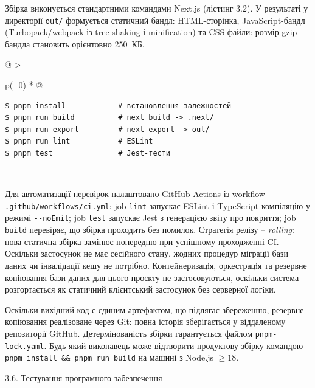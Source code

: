 \documentclass[
]{article}
\begin{document}
Збірка виконується стандартними командами Next.js (лістинг 3.2). У
результаті у директорії \texttt{out}\texttt{/} формується статичний
бандл: HTML-сторінка, JavaScript-бандл (Turbopack/webpack із
tree-shaking і minification) та CSS-файли: розмір gzip-бандла становить
орієнтовно 250~КБ.

\begin{longtable}[]{@{}
  >{\raggedright\arraybackslash}p{}@{}}
\caption{Лістинг 3.2. Команди збірки та перевірки проєкту. Джерело:
розроблено автором.}\tabularnewline
\toprule\noalign{}
\endfirsthead
\endhead
\bottomrule\noalign{}
\endlastfoot
\begin{minipage}[t]{\linewidth}\raggedright
\begin{verbatim}
$ pnpm install            # встановлення залежностей
$ pnpm run build          # next build -> .next/
$ pnpm run export         # next export -> out/
$ pnpm run lint           # ESLint
$ pnpm test               # Jest-тести
\end{verbatim}
\end{minipage} \\
\end{longtable}

Для автоматизації перевірок налаштовано GitHub Actions із workflow
\texttt{.}\texttt{github}\texttt{/}\texttt{workflows}\texttt{/}\texttt{ci.yml}:
job \texttt{lint} запускає ESLint і TypeScript-компіляцію у режимі
\texttt{-\/-}\texttt{noEmit}; job \texttt{test} запускає Jest з
генерацією звіту про покриття; job \texttt{build} перевіряє, що збірка
проходить без помилок. Стратегія релізу -- \emph{rolling}: нова статична
збірка замінює попередню при успішному проходженні CI. Оскільки
застосунок не має сесійного стану, жодних процедур міграції бази даних
чи інвалідації кешу не потрібно. Контейнеризацiя, оркестрацiя та
резервне копiювання бази даних для цього проєкту не застосовуються,
оскiльки система розгортається як статичний клiєнтський застосунок без
серверної логiки.

Оскільки вихідний код є єдиним артефактом, що підлягає збереженню,
резервне копіювання реалізоване через Git: повна історія зберігається у
віддаленому репозиторії GitHub. Детермінованість збірки гарантується
файлом \texttt{pnpm-lock.yaml}. Будь-який виконавець може відтворити
продуктову збірку командою
\texttt{pnpm}\texttt{\ }\texttt{install}\texttt{\ \&\&\ }\texttt{pnpm}\texttt{\ }\texttt{run}\texttt{\ }\texttt{build}
на машині з Node.js \(\geq 18\).

\protect{}\label{_Toc229681157}{}3.6. Тестування
програмного забезпечення
\end{document}
